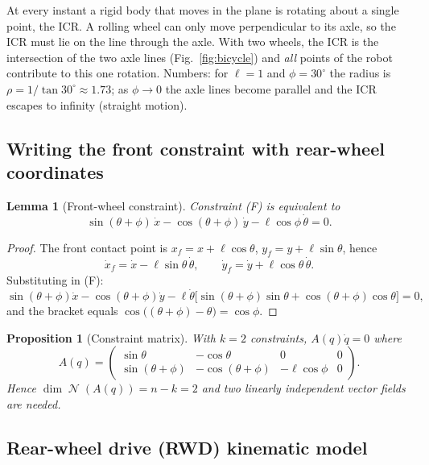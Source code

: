 \documentclass[11pt,a4paper]{article}
\DeclareMathOperator{\Ker}{\mathcal{N}}
\theoremstyle{plain}
\newtheorem{lemma}[theorem]{Lemma}
\newtheorem{proposition}[theorem]{Proposition}
\theoremstyle{definition}
\theoremstyle{remark}
\begin{document}
\begin{intuition}
At every instant a rigid body that moves in the plane is rotating about a single point, the ICR. A rolling wheel can only move perpendicular to its axle, so the ICR must lie on the line through the axle. With two wheels, the ICR is the intersection of the two axle lines (Fig.~\ref{fig:bicycle}) and \emph{all} points of the robot contribute to this one rotation. Numbers: for $\ell=1$ and $\phi=30^\circ$ the radius is $\rho=1/\tan30^\circ\approx1.73$; as $\phi\to0$ the axle lines become parallel and the ICR escapes to infinity (straight motion).
\end{intuition}

\subsection{Writing the front constraint with rear-wheel coordinates}

\begin{lemma}[Front-wheel constraint]
\label{lem:front}
Constraint (F) is equivalent to
\[
\sin(\theta+\phi)\,\dot x-\cos(\theta+\phi)\,\dot y-\ell\cos\phi\,\dot\theta=0 .
\]
\end{lemma}
\begin{proof}
The front contact point is $x_f=x+\ell\cos\theta$, $y_f=y+\ell\sin\theta$, hence
\[
\dot x_f=\dot x-\ell\sin\theta\,\dot\theta,\qquad \dot y_f=\dot y+\ell\cos\theta\,\dot\theta .
\]
Substituting in (F):
\[
\sin(\theta+\phi)\dot x-\cos(\theta+\phi)\dot y-\ell\dot\theta\big[\sin(\theta+\phi)\sin\theta+\cos(\theta+\phi)\cos\theta\big]=0,
\]
and the bracket equals $\cos\big((\theta+\phi)-\theta\big)=\cos\phi$.
\end{proof}

\begin{proposition}[Constraint matrix]
With $k=2$ constraints, $A(q)\dot q=0$ where
\[
A(q)=\begin{pmatrix}
\sin\theta & -\cos\theta & 0 & 0\\
\sin(\theta+\phi) & -\cos(\theta+\phi) & -\ell\cos\phi & 0
\end{pmatrix}.
\]
Hence $\dim\Ker(A(q))=n-k=2$ and two linearly independent vector fields are needed.
\end{proposition}

\subsection{Rear-wheel drive (RWD) kinematic model}
\end{document}
